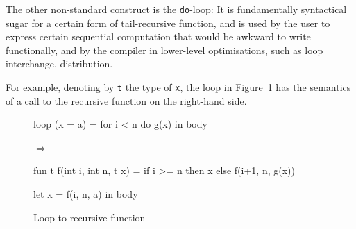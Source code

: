 \documentclass{sigplanconf}  %
\begin{document}
The other non-standard construct is the {\tt do}-loop:  
It is fundamentally syntactical sugar for a certain form of 
tail-recursive function, and is used by the user to express
certain sequential computation that would be awkward to write
functionally, and by the compiler in lower-level optimisations,
such as loop interchange, distribution.  


For example, denoting by {\tt t} the type of {\tt x}, the loop in
Figure~\ref{fig:loop-recursion} has the semantics of a call to the
recursive function on the right-hand side.

\begin{figure}
\begin{minipage}{0.35\columnwidth}
\begin{colorcode}
loop (x = a) =
  for i < n do
    g(x)
in body
\end{colorcode}
\end{minipage}
\begin{minipage}{0.05\columnwidth}
$\Rightarrow$
\end{minipage}
\begin{minipage}{0.6\columnwidth}
\begin{colorcode}
fun t f(int i, int n, t x) =
  if i >= n then x
     else f(i+1, n, g(x))

let x = f(i, n, a)
in body
\end{colorcode}
\end{minipage}
\caption{Loop to recursive function}
\label{fig:loop-recursion}
\end{figure}
\end{document}

